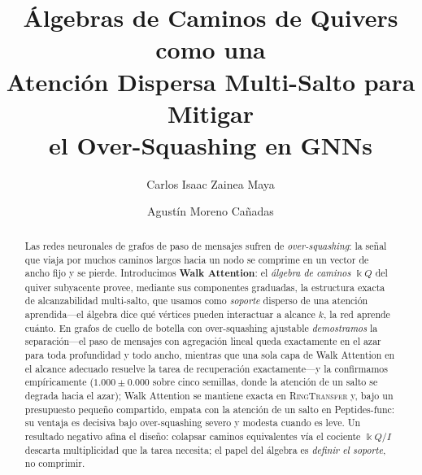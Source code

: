 \documentclass[runningheads]{llncs}
\newcommand{\kk}{\Bbbk}
\newcommand{\kQ}{\kk Q}
\begin{document}
\title{Álgebras de Caminos de Quivers como una\\ Atención Dispersa Multi-Salto para Mitigar\\ el Over-Squashing en GNNs}

\author{Carlos Isaac Zainea Maya \and
Agustín Moreno Cañadas}

\maketitle

\begin{abstract}
Las redes neuronales de grafos de paso de mensajes sufren de
\emph{over-squashing}: la señal que viaja por muchos caminos largos hacia un
nodo se comprime en un vector de ancho fijo y se pierde. Introducimos
\textbf{Walk Attention}: el \emph{álgebra de caminos} $\kQ$ del quiver
subyacente provee, mediante sus componentes graduadas, la estructura exacta de
alcanzabilidad multi-salto, que usamos como \emph{soporte} disperso de una
atención aprendida---el álgebra dice qué vértices pueden interactuar a alcance
$k$, la red aprende cuánto. En grafos de cuello de botella con over-squashing
ajustable \emph{demostramos} la separación---el paso de mensajes con
agregación lineal queda exactamente en el azar para toda profundidad y todo
ancho, mientras que una sola capa de Walk Attention en el alcance adecuado
resuelve la tarea de recuperación exactamente---y la confirmamos
empíricamente ($1.000\pm0.000$ sobre cinco semillas, donde la atención de un
salto se degrada hacia el azar); Walk Attention se mantiene exacta en
\textsc{RingTransfer} y, bajo un presupuesto pequeño compartido, empata con la
atención de un salto en Peptides-func: su ventaja es decisiva bajo
over-squashing severo y modesta cuando es leve. Un resultado negativo afina el
diseño: colapsar caminos equivalentes vía el cociente $\kQ/I$ descarta
multiplicidad que la tarea necesita; el papel del álgebra es \emph{definir el
soporte}, no comprimir.

\end{abstract}
\end{document}

